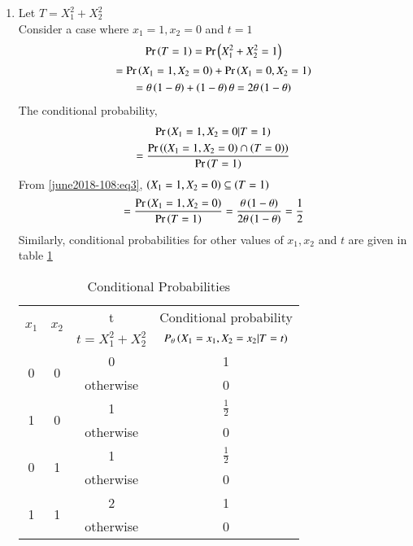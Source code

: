 \begin{enumerate}
    \item Let $T=X_1^2+X_2^2$\\
    Consider a case where $x_1=1, x_2=0$ and $t=1$
    \begin{multline}
        \label{june2018-108:eq3}\Pr\left(T=1\right)=\Pr\left(X_1^2+X_2^2=1\right)\\=\Pr\left(X_1=1,X_2=0\right)+\Pr\left(X_1=0,X_2=1\right)\\=\theta \left(1-\theta\right) + \left(1-\theta\right)\theta  = 2\theta \left(1-\theta\right)
    \end{multline}
    The conditional probability,
    \begin{multline}
        \Pr\left(X_1=1,X_2=0 | T=1\right)\\
        =\frac{\Pr\left(\left(X_1=1,X_2=0\right)\cap\left(T=0\right)\right)}{\Pr\left(T=1\right)}
    \end{multline}
    From \eqref{june2018-108:eq3}, $\left(X_1=1,X_2=0\right) \subseteq \left(T=1\right)$
    \begin{multline}
        =\frac{\Pr\left(X_1=1,X_2=0\right)}{\Pr\left(T=1\right)}=\frac{\theta\left(1-\theta\right)}{2\theta\left(1-\theta\right)}=\frac{1}{2}
    \end{multline}
    Similarly, conditional probabilities for other values of $x_1,x_2$ and $t$ are given in table \ref{june2018-108:table2}
    \begin{table}[h!]
    \begin{tabular}[width=\columnwidth]{|c|c|c|c|}
         \hline
        \multirow{2}{*}{$x_1$} & \multirow{2}{*}{$x_2$} & t & Conditional probability\\
        & & $t=X_1^2+X_2^2$ & $P_\theta\left(X_1=x_1,X_2=x_2|T=t\right)$\\
        \hline
        \multirow{2}{*}{0} & \multirow{2}{*}{0} & 0 & 1\\ 
        & & otherwise & 0 \\ 
        \hline
        \multirow{2}{*}{1} & \multirow{2}{*}{0} & 1 & $\frac{1}{2}$\\ 
        & & otherwise & 0 \\ 
        \hline
        \multirow{2}{*}{0} & \multirow{2}{*}{1} & 1 & $\frac{1}{2}$\\ 
        & & otherwise & 0 \\ 
        \hline
        \multirow{2}{*}{1} & \multirow{2}{*}{1} & 2 & 1\\ 
        & & otherwise & 0 \\        
        \hline
    \end{tabular}
    \caption{Conditional Probabilities}
    \label{june2018-108:table2}
    \end{table}  
    

\end{enumerate}
